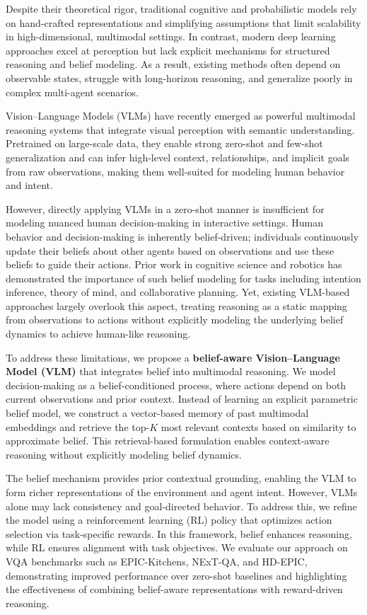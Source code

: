 \documentclass[letterpaper, 10 pt, conference]{ieeeconf}  %
\begin{document}
Despite their theoretical rigor, traditional cognitive and probabilistic models rely on hand-crafted representations and simplifying assumptions that limit scalability in high-dimensional, multimodal settings. In contrast, modern deep learning approaches excel at perception but lack explicit mechanisms for structured reasoning and belief modeling. As a result, existing methods often depend on observable states, struggle with long-horizon reasoning, and generalize poorly in complex multi-agent scenarios.

Vision–Language Models (VLMs) have recently emerged as powerful multimodal reasoning systems that integrate visual perception with semantic understanding. Pretrained on large-scale data, they enable strong zero-shot and few-shot generalization and can infer high-level context, relationships, and implicit goals from raw observations, making them well-suited for modeling human behavior and intent.

However, directly applying VLMs in a zero-shot manner is insufficient for modeling nuanced human decision-making in interactive settings. Human behavior and decision-making is inherently belief-driven; individuals continuously update their beliefs about other agents based on observations and use these beliefs to guide their actions. Prior work in cognitive science and robotics has demonstrated the importance of such belief modeling for tasks including intention inference, theory of mind, and collaborative planning. Yet, existing VLM-based approaches largely overlook this aspect, treating reasoning as a static mapping from observations to actions without explicitly modeling the underlying belief dynamics to achieve human-like reasoning.


To address these limitations, we propose a \textbf{belief-aware Vision–Language Model (VLM)} that integrates belief into multimodal reasoning. We model decision-making as a belief-conditioned process, where actions depend on both current observations and prior context. Instead of learning an explicit parametric belief model, we construct a vector-based memory of past multimodal embeddings and retrieve the top-$K$ most relevant contexts based on similarity to approximate belief. This retrieval-based formulation enables context-aware reasoning without explicitly modeling belief dynamics.

The belief mechanism provides prior contextual grounding, enabling the VLM to form richer representations of the environment and agent intent. However, VLMs alone may lack consistency and goal-directed behavior. To address this, we refine the model using a reinforcement learning (RL) policy that optimizes action selection via task-specific rewards. In this framework, belief enhances reasoning, while RL ensures alignment with task objectives. We evaluate our approach on VQA benchmarks such as EPIC-Kitchens, NExT-QA, and HD-EPIC, demonstrating improved performance over zero-shot baselines and highlighting the effectiveness of combining belief-aware representations with reward-driven reasoning.
\end{document}
